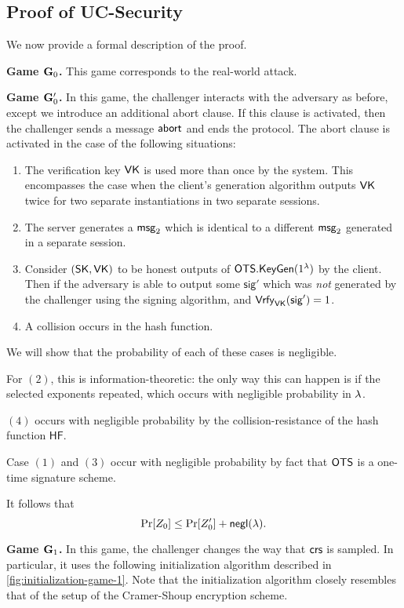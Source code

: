 \subsection{Proof of UC-Security}

We now provide a formal description of the proof.

\textbf{Game $\mathbf{G}_0$.} This game corresponds to the real-world attack.

\textbf{Game $\mathbf{G}_0'$.} In this game, the challenger interacts with the adversary as before, except we introduce an additional abort clause. If this clause is activated, then the challenger sends a message $\mathsf{abort}$ and ends the protocol. The abort clause is activated in the case of the following situations:
\begin{enumerate}
	\item The verification key $\mathsf{VK}$ is used more than once by the system. This encompasses the case when the client's generation algorithm outputs $\mathsf{VK}$ twice for two separate instantiations in two separate sessions.
	\item The server generates a $\mathsf{msg}_{2}$ which is identical to a different $\mathsf{msg}_{2}$ generated in a separate session.
	\item Consider $(\mathsf{SK},\mathsf{VK})$ to be honest outputs of $\mathsf{OTS}.\mathsf{KeyGen}(1^\lambda)$ by the client. Then if the adversary is able to output some $\mathsf{sig}'$ which was \textit{not} generated by the challenger using the signing algorithm, and $\mathsf{Vrfy}_{\mathsf{VK}}(\mathsf{sig}')=1$. 
	\item A collision occurs in the hash function.
\end{enumerate}

We will show that the probability of each of these cases is negligible. 

For $(2)$, this is information-theoretic: the only way this can happen is if the selected exponents repeated, which occurs with negligible probability in $\lambda$. 

$(4)$ occurs with negligible probability by the collision-resistance of the hash function $\mathsf{HF}$.

Case $(1)$ and $(3)$ occur with negligible probability by fact that $\mathsf{OTS}$ is a one-time signature scheme.


It follows that $$\Pr[Z_0] \leq \Pr[Z_0']+\mathsf{negl}(\lambda).$$

\textbf{Game $\mathbf{G}_1$.} In this game, the challenger changes the way that $\mathsf{crs}$ is sampled. In particular, it uses the following initialization algorithm described in \cref{fig:initialization-game-1}. Note that the initialization algorithm closely resembles that of the setup of the Cramer-Shoup encryption scheme.

